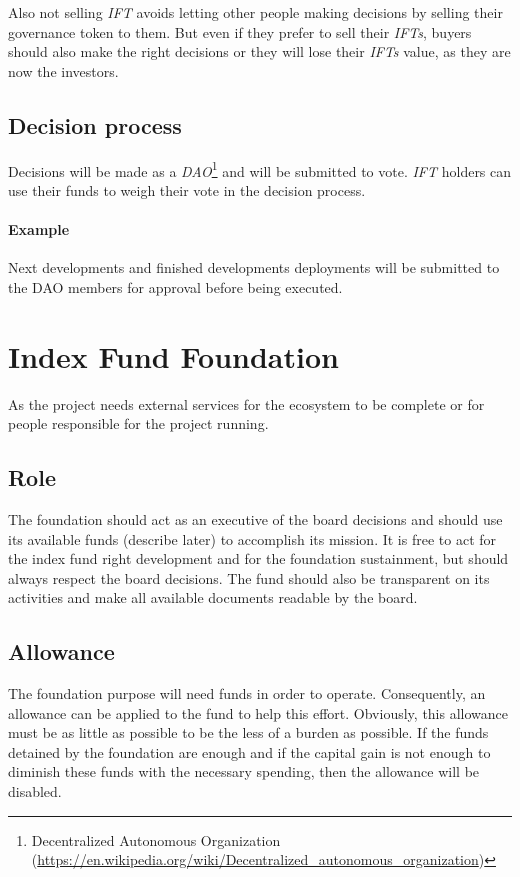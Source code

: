 \documentclass[11pt]{scrartcl}
\begin{document}
    Also not selling \textit{IFT} avoids letting
    other people making decisions by selling their governance token to them.
    But even if they prefer to sell their \textit{IFTs}, buyers should also make
    the right decisions or they will lose their \textit{IFTs} value, as they 
    are now the investors.

    \subsection{Decision process}
    Decisions will be made as a \textit{DAO}\footnote{Decentralized Autonomous Organization
        (\url{https://en.wikipedia.org/wiki/Decentralized_autonomous_organization})}
    and will be submitted to vote. \textit{IFT} holders can use their funds to
    weigh their vote in the decision process. 

    \paragraph{Example}
    Next developments and finished developments deployments will be submitted to 
    the DAO members for approval before being executed.

    \section{Index Fund Foundation}
    As the project needs external services for the ecosystem to be complete or
    for people responsible for the project running.
    
    \subsection{Role}
    The foundation should act as an executive of the board decisions and should use 
    its available funds (describe later) to accomplish its mission. It is free to 
    act for the index fund right development and for the foundation sustainment, but 
    should always respect the board decisions. The fund should also be transparent
    on its activities and make all available documents readable by the 
    board.

    \subsection{Allowance}
    The foundation purpose will need funds in order to operate.
    Consequently, an allowance can be applied to the fund to help this 
    effort. Obviously, this allowance must be as little as possible to be the less of a 
    burden as possible. If the funds detained by the foundation are enough and
    if the capital gain is not enough to diminish these funds with the necessary
    spending, then the allowance will be disabled.
    
\end{document}
